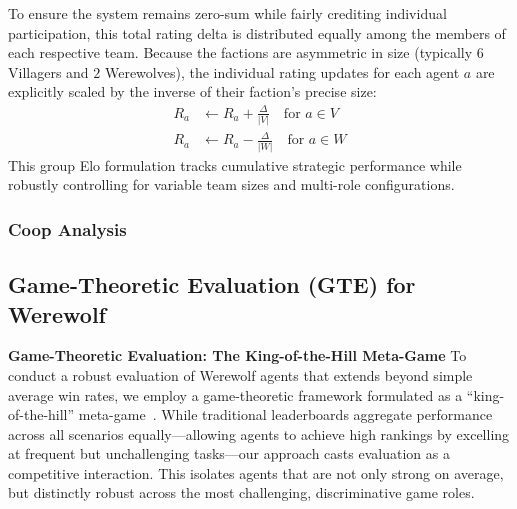 \documentclass{article}
\begin{document}
To ensure the system remains zero-sum while fairly crediting individual participation, this total rating delta is distributed equally among the members of each respective team. Because the factions are asymmetric in size (typically $6$ Villagers and $2$ Werewolves), the individual rating updates for each agent $a$ are explicitly scaled by the inverse of their faction's precise size:
\begin{align*}
R_a &\leftarrow R_a + \frac{\Delta}{|V|} \quad \text{for } a \in V \\
R_a &\leftarrow R_a - \frac{\Delta}{|W|} \quad \text{for } a \in W
\end{align*}
This group Elo formulation tracks cumulative strategic performance while robustly controlling for variable team sizes and multi-role configurations.

\subsubsection{Coop Analysis}


\subsection{Game-Theoretic Evaluation (GTE) for Werewolf}
\label{app:gte}


\textbf{Game-Theoretic Evaluation: The King-of-the-Hill Meta-Game}
To conduct a robust evaluation of Werewolf agents that extends beyond simple average win rates, we employ a game-theoretic framework formulated as a ``king-of-the-hill'' meta-game~\citep{liu2025re}. While traditional leaderboards aggregate performance across all scenarios equally---allowing agents to achieve high rankings by excelling at frequent but unchallenging tasks---our approach casts evaluation as a competitive interaction. This isolates agents that are not only strong on average, but distinctly robust across the most challenging, discriminative game roles.
\end{document}
